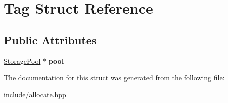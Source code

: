 \hypertarget{struct_tag}{}\section{Tag Struct Reference}
\label{struct_tag}
\subsection*{Public Attributes}
\begin{DoxyCompactItemize}
\item 
\hyperlink{class_storage_pool}{Storage\+Pool} $\ast$ {\bfseries pool}\hypertarget{struct_tag_aa4adbc74180401c6e0bff0a4c429f37e}{}\label{struct_tag_aa4adbc74180401c6e0bff0a4c429f37e}

\end{DoxyCompactItemize}


The documentation for this struct was generated from the following file\+:\begin{DoxyCompactItemize}
\item 
include/allocate.\+hpp\end{DoxyCompactItemize}
